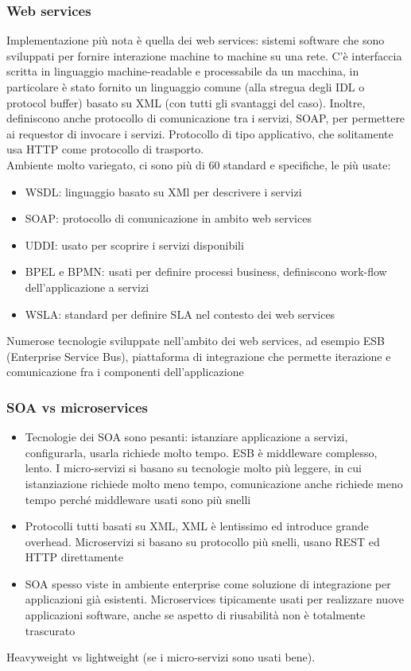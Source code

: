 \documentclass[16px]{article}
\begin{document}
\subsubsection{Web services}
Implementazione più nota è quella dei web services: sistemi software che sono sviluppati per fornire interazione machine to machine su una rete. C'è interfaccia scritta in linguaggio machine-readable e processabile da un macchina, in particolare è stato fornito un linguaggio comune (alla stregua degli IDL o protocol buffer) basato su XML (con tutti gli svantaggi del caso). Inoltre, definiscono anche protocollo di comunicazione tra i servizi, SOAP, per permettere ai requestor di invocare i servizi. Protocollo di tipo applicativo, che solitamente usa HTTP come protocollo di trasporto.\\ Ambiente molto variegato, ci sono più di 60 standard e specifiche, le più usate:
\begin{itemize}
\item WSDL: linguaggio basato su XMl per descrivere i servizi
\item SOAP: protocollo di comunicazione in ambito web services
\item UDDI: usato per scoprire i servizi disponibili
\item BPEL e BPMN: usati per definire processi business, definiscono work-flow dell'applicazione a servizi
\item WSLA: standard per definire SLA nel contesto dei web services
\end{itemize}
Numerose tecnologie sviluppate nell'ambito dei web services, ad esempio ESB (Enterprise Service Bus), piattaforma di integrazione che permette iterazione e comunicazione fra i componenti dell'applicazione
\subsubsection{SOA vs microservices}
\begin{itemize}
\item Tecnologie dei SOA sono pesanti: istanziare applicazione a servizi, configurarla, usarla richiede molto tempo. ESB è middleware complesso, lento. I micro-servizi si basano su tecnologie molto più leggere, in cui istanziazione richiede molto meno tempo, comunicazione anche richiede meno tempo perché middleware usati sono più snelli
\item Protocolli tutti basati su XML, XML è lentissimo ed introduce grande overhead. Microservizi si basano su protocollo più snelli, usano REST ed HTTP direttamente
\item SOA spesso viste in ambiente enterprise come soluzione di integrazione per applicazioni già esistenti. Microservices tipicamente usati per realizzare nuove applicazioni software, anche se aspetto di riusabilità non è totalmente trascurato
\end{itemize}
Heavyweight vs lightweight (se i micro-servizi sono usati bene).
\end{document}
